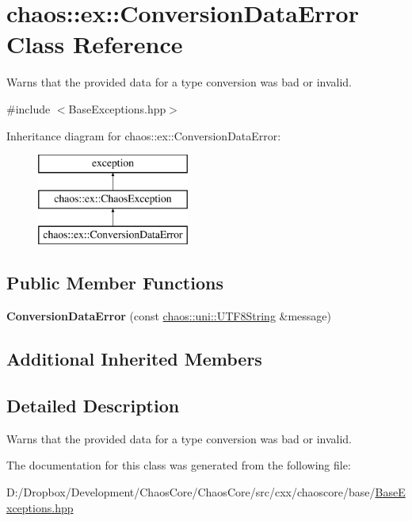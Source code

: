 \hypertarget{classchaos_1_1ex_1_1_conversion_data_error}{}\section{chaos\+:\+:ex\+:\+:Conversion\+Data\+Error Class Reference}
\label{classchaos_1_1ex_1_1_conversion_data_error}


Warns that the provided data for a type conversion was bad or invalid.  




{\ttfamily \#include $<$Base\+Exceptions.\+hpp$>$}

Inheritance diagram for chaos\+:\+:ex\+:\+:Conversion\+Data\+Error\+:\begin{figure}[H]
\begin{center}
\leavevmode
\includegraphics[height=3.000000cm]{classchaos_1_1ex_1_1_conversion_data_error}
\end{center}
\end{figure}
\subsection*{Public Member Functions}
\begin{DoxyCompactItemize}
\item 
\hypertarget{classchaos_1_1ex_1_1_conversion_data_error_aed2ab811adb6562477bf2997354f87a9}{}{\bfseries Conversion\+Data\+Error} (const \hyperlink{classchaos_1_1uni_1_1_u_t_f8_string}{chaos\+::uni\+::\+U\+T\+F8\+String} \&message)\label{classchaos_1_1ex_1_1_conversion_data_error_aed2ab811adb6562477bf2997354f87a9}

\end{DoxyCompactItemize}
\subsection*{Additional Inherited Members}


\subsection{Detailed Description}
Warns that the provided data for a type conversion was bad or invalid. 

The documentation for this class was generated from the following file\+:\begin{DoxyCompactItemize}
\item 
D\+:/\+Dropbox/\+Development/\+Chaos\+Core/\+Chaos\+Core/src/cxx/chaoscore/base/\hyperlink{_base_exceptions_8hpp}{Base\+Exceptions.\+hpp}\end{DoxyCompactItemize}
